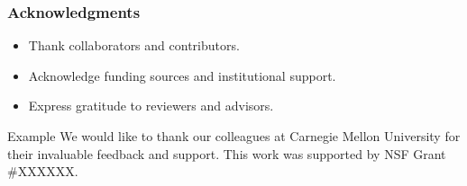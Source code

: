 \documentclass{beamer}
\begin{document}
\begin{frame}
\frametitle{Acknowledgments}
\begin{itemize}
    \item Thank collaborators and contributors.
    \item Acknowledge funding sources and institutional support.
    \item Express gratitude to reviewers and advisors.
\end{itemize}
\begin{block}{Example}
    We would like to thank our colleagues at Carnegie Mellon University for their invaluable feedback and support. This work was supported by NSF Grant \#XXXXXX.
\end{block}
\end{frame}
\end{document}
